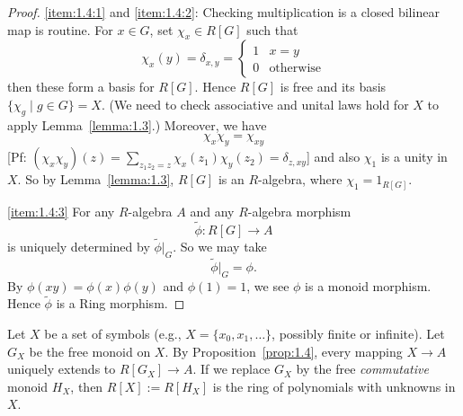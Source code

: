 \begin{proof}
\ref{item:1.4:1} and \ref{item:1.4:2}: Checking multiplication is a
closed bilinear map is routine. For $x\in G$, set $\chi_{x}\in R[G]$
such that
\begin{equation}
\chi_{x}(y)=\delta_{x,y}=\begin{cases}1 & x=y\\
0 & \mbox{otherwise}
\end{cases}
\end{equation}
then these form a basis for $R[G]$. Hence $R[G]$ is free and its basis
$\{\chi_{g}\mid g\in G\}=X$. (We need to check associative and unital
laws hold for $X$ to apply Lemma~\ref{lemma:1.3}.) Moreover, we have
\begin{equation}
\chi_{x}\chi_{y}=\chi_{xy}
\end{equation}
[Pf: $(\chi_{x}\chi_{y})(z)=\sum_{z_{1}z_{2}=z}\chi_{x}(z_{1})\chi_{y}(z_{2})=\delta_{z,xy}$]
and also $\chi_{1}$ is a unity in $X$. So by Lemma~\ref{lemma:1.3},
$R[G]$ is an $R$-algebra, where $\chi_{1}=1_{R[G]}$.

\ref{item:1.4:3} For any $R$-algebra $A$ and any $R$-algebra morphism
\begin{equation}
\widetilde{\phi}\colon R[G]\to A
\end{equation}
is uniquely determined by $\widetilde{\phi}|_{G}$. So we may take 
\begin{equation}
\widetilde{\phi}|_{G}=\phi.
\end{equation}
By $\phi(xy)=\phi(x)\phi(y)$ and $\phi(1)=1$, we see $\phi$ is a
monoid morphism. Hence $\widetilde{\phi}$ is a Ring morphism.
\end{proof}

\begin{example}\label{ex:1.5}
Let $X$ be a set of symbols (e.g., $X=\{x_{0},x_{1},\dots\}$, possibly
finite or infinite). Let $G_{X}$ be the free monoid on $X$. By
Proposition~\ref{prop:1.4}, every mapping $X\to A$ uniquely extends to
$R[G_{X}]\to A$. If we replace $G_{X}$ by the free \emph{commutative}
monoid $H_{X}$, then $R[X]:=R[H_{X}]$ is the ring of polynomials with
unknowns in $X$.
\end{example}

